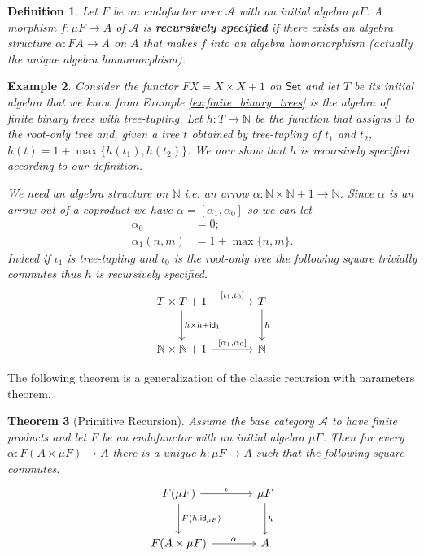 \documentclass[letterpaper, 11pt, oneside]{memoir}
\theoremstyle{myteo}
\newtheorem{theorem}{Theorem}[section]
\newtheorem{definition}[theorem]{Definition}
\newtheorem{example}[theorem]{Example}
\numberwithin{equation}{section}
\newcommand{\marginnote}[1]{\marginpar{\footnotesize #1}}
\newcommand{\id}{\textsf{id}}
\newcommand{\Set}{\textsf{Set}}
\newcommand{\N}{\mathbb{N}}
\newcommand{\A}{\mathscr{A}}
\newcommand{\outofcoprod}[2]{{[#1, #2]}}
\newcommand{\intoprod}[2]{{\langle #1, #2\rangle}}
\begin{document}
\begin{definition}
  Let \(F\) be an endofuctor over \(\A\) with an initial algebra \(\mu F\).
  A morphism \(f \colon \mu F \to A\) of \(\A\) is \textbf{recursively specified} \marginnote{recursively specified morphism} if there exists an algebra structure \(\alpha \colon FA \to A\) on \(A\) that makes \(f\) into an algebra homomorphism (actually the unique algebra homomorphism).
\end{definition}

\begin{example}
  Consider the functor \(FX = X \times X + 1\) on \(\Set\) and let \(T\) be its initial algebra that we know from Example \ref{ex:finite_binary_trees} is the algebra of finite binary trees with tree-tupling.
  Let \(h \colon T \to \mathbb{N}\) be the function that assigns \(0\) to the root-only tree and, given a tree \(t\) obtained by tree-tupling of \(t_1\) and \(t_2\), \(h(t) = 1 + \max\{h(t_1), h(t_2)\}\).
  We now show that \(h\) is recursively specified according to our definition.

  We need an algebra structure on \(\mathbb{N}\) i.e. an arrow \(\alpha \colon \N \times \N + 1 \to \N\).
  Since \(\alpha\) is an arrow out of a coproduct we have \(\alpha = [\alpha_1, \alpha_0]\) so we can let
  \begin{align*}
    \alpha_0 &= 0;\\
    \alpha_1(n, m) &= 1 + \max\{n, m\}.
  \end{align*}
  Indeed if \(\iota_1\) is tree-tupling and \(\iota_0\) is the root-only tree the following square trivially commutes thus \(h\) is recursively specified.
  \begin{equation*}
    \begin{tikzcd}[sep = large]
      T \times T + 1 \ar[r, "\outofcoprod{\iota_1}{\iota_0}"] \ar[d, "h \times h + \id_1"] & T \ar[d, "h"]\\
      \N \times \N + 1 \ar[r, "\outofcoprod{\alpha_1}{\alpha_0}"] & \N
    \end{tikzcd}
  \end{equation*}
\end{example}

The following theorem is a generalization of the classic recursion with parameters theorem.

\begin{theorem}[Primitive Recursion]
  \label{teo:primitive_recursion}
  Assume the base category \(\mathscr{A}\) to have finite products and let \(F\) be an endofunctor with an initial algebra \(\mu F\).
  Then for every \(\alpha \colon F(A \times \mu F) \to A\) there is a unique \(h \colon \mu F \to A\) such that the following square commutes.
  \begin{equation}
    \label{dia:recursion}
    \begin{tikzcd}[sep = large]
      F(\mu F) \ar[r, "\iota"] \ar[d, "F \intoprod{h}{\id_{\mu F}}"] & \mu F \ar[d, "h"] \\
      F(A \times \mu F) \ar[r, "\alpha"] & A
    \end{tikzcd}
  \end{equation}
\end{theorem}
\end{document}
